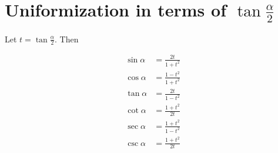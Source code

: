 \documentclass{article}
\begin{document}
        \section{Uniformization in terms of $\tan \frac{\alpha}{2}$}

        Let $t = \tan \frac{\alpha}{2}$. Then

        \begin{align}
                \sin \alpha &= \frac{2t}{1 + t^2}\\
                \cos \alpha &= \frac{1 - t^2}{1 + t^2}\\
                \tan \alpha &= \frac{2t}{1 - t^2}\\
                \cot \alpha &= \frac{1 + t^2}{2t}\\
                \sec \alpha &= \frac{1 + t^2}{1 - t^2}\\
                \csc \alpha &= \frac{1 + t^2}{2t}
        \end{align}
\end{document}
